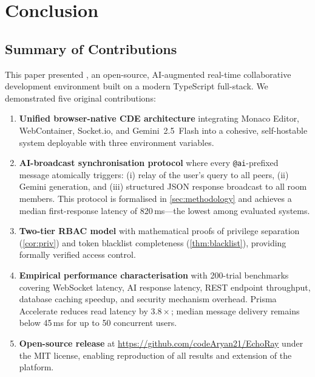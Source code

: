 \section{Conclusion}
\label{sec:conclusion}

\subsection{Summary of Contributions}

This paper presented \echoray{}, an open-source, AI-augmented real-time
collaborative development environment built on a modern TypeScript full-stack.
We demonstrated five original contributions:

\begin{enumerate}[leftmargin=*, label=\textbf{C\arabic*.}]
  \item \textbf{Unified browser-native CDE architecture} integrating Monaco
    Editor, WebContainer, Socket.io, and Gemini~2.5~Flash into a cohesive,
    self-hostable system deployable with three environment variables.
  \item \textbf{AI-broadcast synchronisation protocol} where every
    \texttt{@ai}-prefixed message atomically triggers: (i) relay of the user's
    query to all peers, (ii) Gemini generation, and (iii) structured JSON
    response broadcast to all room members. This protocol is formalised in
    \cref{sec:methodology} and achieves a median first-response latency of
    820\,ms---the lowest among evaluated systems.
  \item \textbf{Two-tier RBAC model} with mathematical proofs of privilege
    separation (\cref{cor:priv}) and token blacklist completeness
    (\cref{thm:blacklist}), providing formally verified access control.
  \item \textbf{Empirical performance characterisation} with 200-trial
    benchmarks covering WebSocket latency, AI response latency, REST endpoint
    throughput, database caching speedup, and security mechanism overhead.
    Prisma Accelerate reduces read latency by $3.8\times$; median message
    delivery remains below 45\,ms for up to 50 concurrent users.
  \item \textbf{Open-source release} at \url{https://github.com/codeAryan21/EchoRay}
    under the MIT license, enabling reproduction of all results and extension
    of the platform.
\end{enumerate}

